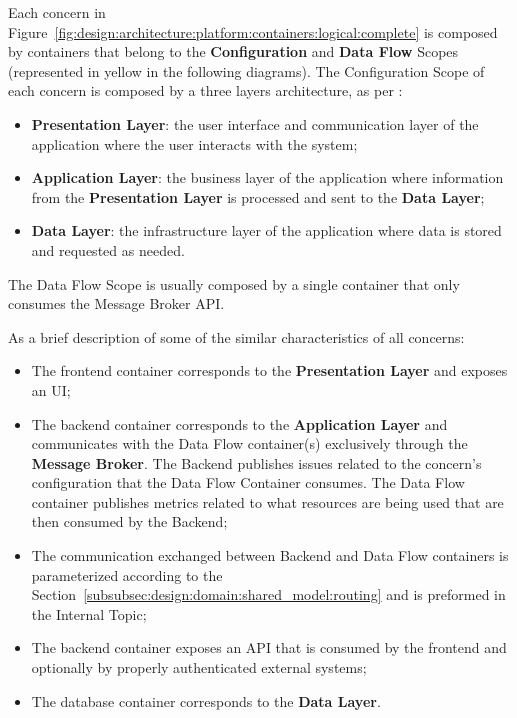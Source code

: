 Each concern in Figure~\ref{fig:design:architecture:platform:containers:logical:complete} is composed by containers that belong to the \textbf{Configuration} and \textbf{Data Flow} Scopes (represented in yellow in the following diagrams).
The Configuration Scope of each concern is composed by a three layers architecture, as per \cite{3tier}:

\begin{itemize}
   \item \textbf{Presentation Layer}: the user interface and communication layer of the application where the user interacts with the system;
   \item \textbf{Application Layer}: the business layer of the application where information from the \textbf{Presentation Layer} is processed and sent to the \textbf{Data Layer};
   \item \textbf{Data Layer}: the infrastructure layer of the application where data is stored and requested as needed.
\end{itemize}

The Data Flow Scope is usually composed by a single container that only consumes the Message Broker \gls{API}.

As a brief description of some of the similar characteristics of all concerns:

\begin{itemize}
   \item The frontend container corresponds to the \textbf{Presentation Layer} and exposes an \gls{UI};
   \item The backend container corresponds to the \textbf{Application Layer} and communicates with the Data Flow container(s) exclusively through the \textbf{Message Broker}. The Backend publishes issues related to the concern's configuration that the Data Flow Container consumes. The Data Flow container publishes metrics related to what resources are being used that are then consumed by the Backend;
   \item The communication exchanged between Backend and Data Flow containers is parameterized according to the Section~\ref{subsubsec:design:domain:shared_model:routing} and is preformed in the Internal Topic;
   \item The backend container exposes an \gls{API} that is consumed by the frontend and optionally by properly authenticated external systems;
   \item The database container corresponds to the \textbf{Data Layer}.
\end{itemize}

